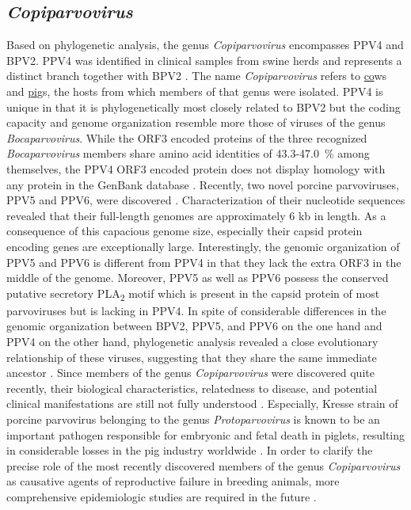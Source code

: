 \subsection{\textit{Copiparvovirus}}
Based on phylogenetic analysis, the genus \textit{Copiparvovirus} encompasses PPV4 and BPV2. PPV4 was identified in clinical samples from swine herds \cite{pmid20339886, pmid21092136, pmid22967311} and represents a distinct branch together with BPV2 \cite{pmid11562506}. The name \textit{Copiparvovirus} refers to \underline{co}ws and \underline{pi}gs, the hosts from which members of that genus were isolated. PPV4 is unique in that it is phylogenetically most closely related to BPV2 but the coding capacity and genome organization resemble more those of viruses of the genus \textit{Bocaparvovirus}. While the ORF3 encoded proteins of the three recognized \textit{Bocaparvovirus} members share amino acid identities of 43.3-47.0~\% among themselves, the PPV4 ORF3 encoded protein does not display homology with any protein in the GenBank database \cite{pmid20339886, pmid21092136}. 
Recently, two novel porcine parvoviruses, PPV5 and PPV6, were discovered \cite{pmid23405295, pmid25442288}. Characterization of their nucleotide sequences revealed that their full-length genomes are approximately 6 kb in length. As a consequence of this capacious genome size, especially their capsid protein encoding genes are exceptionally large. Interestingly, the genomic organization of PPV5 and PPV6 is different from PPV4 in that they lack the extra ORF3 in the middle of the genome. Moreover, PPV5 as well as PPV6 possess the conserved putative secretory PLA\textsubscript{2} motif which is present in the capsid protein of most parvoviruses but is lacking in PPV4. In spite of considerable differences in the genomic organization between BPV2, PPV5, and PPV6 on the one hand and PPV4 on the other hand, phylogenetic analysis revealed a close evolutionary relationship of these viruses, suggesting that they share the same immediate ancestor \cite{pmid23762339, pmid25442288}.      
Since members of the genus \textit{Copiparvovirus} were discovered quite recently, their biological characteristics, relatedness to disease, and potential clinical manifestations are still not fully understood \cite{pmid20339886, pmid21092136, pmid23762339, pmid25442288}. Especially, Kresse strain of porcine parvovirus belonging to the genus \textit{Protoparvovirus} is known to be an important pathogen responsible for embryonic and fetal death in piglets, resulting in considerable losses in the pig industry worldwide \cite{pmid6314634, pmid427636, pmid999067, pmid3006323}. In order to clarify the precise role of the most recently discovered members of the genus \textit{Copiparvovirus} as causative agents of reproductive failure in breeding animals, more comprehensive epidemiologic studies are required in the future \cite{pmid25442288}. 



